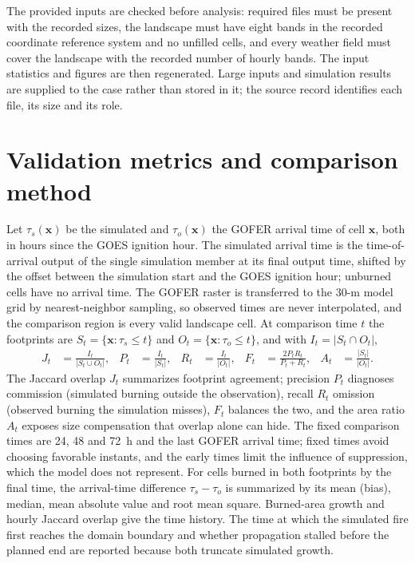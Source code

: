 The provided inputs are checked before analysis: required files must be
present with the recorded sizes, the landscape must have eight bands in the
recorded coordinate reference system and no unfilled cells, and every weather
field must cover the landscape with the recorded number of hourly bands.  The
input statistics and figures are then regenerated.  Large inputs and
simulation results are supplied to the case rather than stored in it; the
source record identifies each file, its size and its role.  \RevisionText{}

\section{Validation metrics and comparison method}

Let $\tau_s(\mathbf{x})$ be the simulated and $\tau_o(\mathbf{x})$ the GOFER
arrival time of cell $\mathbf{x}$, both in hours since the GOES ignition hour.
The simulated arrival time is the time-of-arrival output of the single
simulation member at its final output time, shifted by the offset between the
simulation start and the GOES ignition hour; unburned cells have no arrival
time.  The GOFER raster is transferred to the 30-m model grid by
nearest-neighbor sampling, so observed times are never interpolated, and the
comparison region is every valid landscape cell.  At comparison time $t$ the
footprints are $S_t=\{\mathbf{x}:\tau_s\le t\}$ and $O_t=\{\mathbf{x}:\tau_o\le
t\}$, and with $I_t=|S_t\cap O_t|$,
\begin{align}
 J_t&=\frac{I_t}{|S_t\cup O_t|}, &
 P_t&=\frac{I_t}{|S_t|}, &
 R_t&=\frac{I_t}{|O_t|}, &
 F_t&=\frac{2P_tR_t}{P_t+R_t}, &
 A_t&=\frac{|S_t|}{|O_t|}.
\end{align}
The Jaccard overlap $J_t$ summarizes footprint agreement; precision $P_t$
diagnoses commission (simulated burning outside the observation), recall $R_t$
omission (observed burning the simulation misses), $F_t$ balances the two, and
the area ratio $A_t$ exposes size compensation that overlap alone can hide.
The fixed comparison times are 24, 48 and 72~h and the last GOFER arrival time;
fixed times avoid choosing favorable instants, and the early times limit the
influence of suppression, which the model does not represent.  For cells burned
in both footprints by the final time, the arrival-time difference
$\tau_s-\tau_o$ is summarized by its mean (bias), median, mean absolute value
and root mean square.  Burned-area growth and hourly Jaccard overlap give the
time history.  The time at which the simulated fire first reaches the domain
boundary and whether propagation stalled before the planned end are reported
because both truncate simulated growth.

